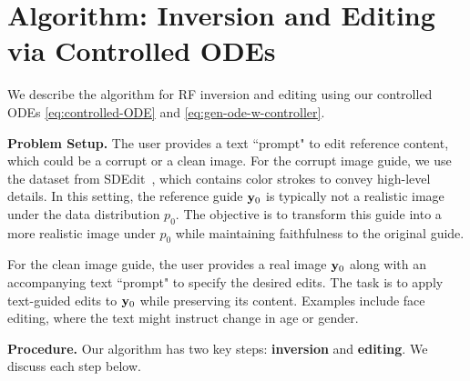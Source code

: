 \documentclass{article} %
\theoremstyle{plain}
\begin{document}
\vspace{-2ex}
\section{Algorithm: Inversion and Editing via Controlled ODEs}
\label{sec:algos}
\vspace{-1ex}
We describe the algorithm for RF inversion and editing using our controlled ODEs \eqref{eq:controlled-ODE} and \eqref{eq:gen-ode-w-controller}.

\textbf{Problem Setup.} 
The user provides a text ``prompt" to edit reference content, which could be a corrupt or a clean image. 
For the corrupt image guide, we use the dataset from SDEdit~\citep{sdedit}, which contains color strokes to convey high-level details.
In this setting, the reference guide ${\mathbf{y}}_0$ is typically not a realistic image under the data distribution $p_0$.
The objective is to transform this guide into a more realistic image under $p_0$ while maintaining faithfulness to the original guide. 

For the clean image guide, the user provides a real image ${\mathbf{y}}_0$ along with an accompanying text ``prompt" to specify the desired edits.
The task is to apply text-guided edits to ${\mathbf{y}}_0$ while preserving its content. 
Examples include face editing, where the text might instruct change in age or gender.

\textbf{Procedure.} Our algorithm has two key steps: \textbf{inversion} and \textbf{editing}. We discuss each step below.
\end{document}

